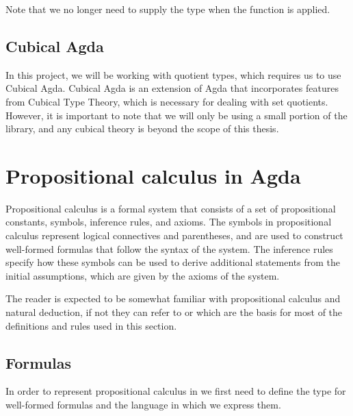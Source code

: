 \documentclass[titlepage]{article}
\begin{document}
Note that we no longer need to supply the type when the function is applied.


\subsection{Cubical Agda}

In this project, we will be working with quotient types, which requires us to use Cubical Agda. Cubical Agda is an extension of Agda that incorporates features from Cubical Type Theory, which is necessary for dealing with set quotients.\cite{AgdaDoc} However, it is important to note that we will only be using a small portion of the \agdaCubical library, and any cubical theory is beyond the scope of this thesis.




\section{Propositional calculus in Agda}



Propositional calculus is a formal system that consists of a set of propositional constants, symbols, inference rules, and axioms. The symbols in propositional calculus represent logical connectives and parentheses, and are used to construct well-formed formulas that follow the syntax of the system. The inference rules specify how these symbols can be used to derive additional statements from the initial assumptions, which are given by the axioms of the system. 

The reader is expected to be somewhat familiar with propositional calculus and natural deduction, if not they can refer to \cite{carlstrom} or \cite{vanDalen} which are the basis for most of the definitions and rules used in this section.



\subsection{Formulas}

In order to represent propositional calculus in \Agda we first need to define the type for well-formed formulas and the language in which we express them.
\end{document}
